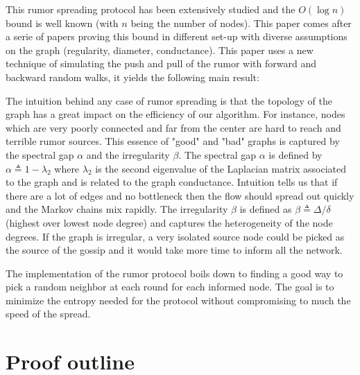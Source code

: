 \documentclass[10pt,journal,a4paper]{IEEEtran}
\begin{document}
This rumor spreading protocol has been extensively studied and the $O(\log n)$ bound is well known (with $n$ being the number of nodes). This paper comes after a serie of papers proving this bound in different set-up with diverse assumptions on the graph (regularity, diameter, conductance). This paper uses a new technique of simulating the push and pull of the rumor with forward and backward random walks, it yields the following main result:

\vspace{.3cm}
\noindent{}
\vspace{.3cm}

The intuition behind any case of rumor spreading is that the topology of the graph has a great impact on the efficiency of our algorithm. For instance, nodes which are very poorly connected and far from the center are hard to reach and terrible rumor sources. This essence of "good" and "bad" graphs is captured by the spectral gap $\alpha$ and the irregularity $\beta$. The spectral gap $\alpha$ is defined by $\alpha \triangleq 1 - \lambda_2$ where $\lambda_2$ is the second eigenvalue of the Laplacian matrix associated to the graph \cite{jerrum} and is related to the graph conductance. Intuition tells us that if there are a lot of edges and no bottleneck then the flow should spread out quickly and the Markov chains mix rapidly. The irregularity $\beta$ is defined as $\beta \triangleq \Delta/\delta$ (highest over lowest node degree) and captures the heterogeneity of the node degrees. If the graph is  irregular, a very isolated source node could be picked as the source of the gossip and it would take more time to inform all the network.

The implementation of the rumor protocol boils down to finding a good way to pick a random neighbor at each round for each informed node. The goal is to minimize the entropy needed for the protocol without compromising to much the speed of the spread. 

\section{Proof outline}
\end{document}

